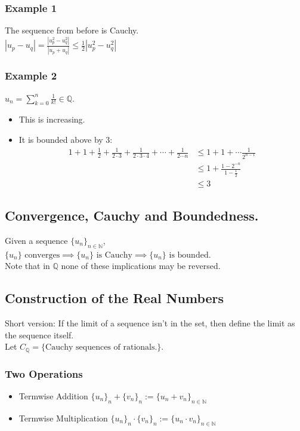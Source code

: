 \documentclass[11pt]{article}
\newcommand{\0}{\emptyset}
\newcommand{\N}{\mathbb{N}}
\newcommand{\Q}{\mathbb{Q}}
\begin{document}
\subsubsection*{Example 1}
\label{sec:orgcaaacfc}
The sequence from before is Cauchy.\\[0pt]
\(|u_{p}-u_{q}|=\frac{|u_{p}^{2}-u_{q}^{2}|}{|u_{p}+u_{q}|} \leq \frac{1}{2}|u_{p}^{2}-u_{q}^{2}|\)\\[0pt]
\subsubsection*{Example 2}
\label{sec:orgf8351df}
\(u_{n}=\sum_{k=0}^{n}\frac{1}{k!} \in\Q\).\\[0pt]
\begin{itemize}
\item This is increasing.\\[0pt]
\item It is bounded above by \(3\):\\[0pt]
\begin{align*}
 1+1+\frac{1}{2}+\frac{1}{2\cdot 3}+\frac{1}{2\cdot 3\cdot 4}+\cdots+\frac{1}{2\cdots n}
 &\leq 1+1+\cdots\frac{1}{2^{n-1}}
 \\&\leq 1+\frac{1-2^{-n}}{1-\frac{1}{2}}
 \\&\leq 3
\end{align*}
\end{itemize}
\subsection*{Convergence, Cauchy and Boundedness.}
\label{sec:org4f4420d}
Given a sequence \(\{u_{n}\}_{n\in\N}\),\\[0pt]
  \(\{u_{n}\}\text{ converges}\implies\{u_{n}\}\text{ is Cauchy}\implies\{u_{n}\}\text{ is bounded}\).\\[0pt]
Note that in \(\Q\) none of these implications may be reversed.\\[0pt]
\subsection*{Construction of the Real Numbers}
\label{sec:org36d3a4e}
Short version: If the limit of a sequence isn't in the set, then define the limit as the sequence itself.\\[0pt]
Let \(C_{\Q}=\{\text{Cauchy sequences of rationals.}\}\).\\[0pt]
\subsubsection*{Two Operations}
\label{sec:org9e885f6}
\begin{itemize}
\item Termwise Addition
\label{sec:org081a9b5}
\(\{u_{n}\}_{n}+\{v_{n}\}_{n}:=\{u_{n}+v_{n}\}_{n\in\N}\)\\[0pt]
\item Termwise Multiplication
\label{sec:orgcba09f3}
\(\{u_{n}\}_{n}\cdot\{v_{n}\}_{n}:=\{u_{n}\cdot v_{n}\}_{n\in\N}\)\\[0pt]
\end{itemize}
\end{document}
